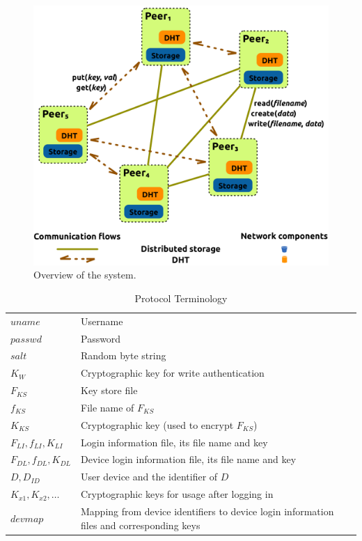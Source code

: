 \begin{figure}
  \centering
  \includegraphics[width=.44\textwidth]{images/passwords-peer-to-peer/system-overview-fully-distributed}
  \caption{Overview of the system.}
\end{figure}

\begin{table}[htb]
\centering
\caption{Protocol Terminology}
    \begin{tabular}{lp{5.92cm}}
 		\toprule
		$uname$ & Username\\
		$passwd$ & Password\\
		$salt$ & Random byte string\\
		$K_W$ & Cryptographic key for write authentication \\
		$F_{KS}$ & Key store file\\
		$f_{KS}$ & File name of $F_{KS}$\\
		$K_{KS}$ & Cryptographic key (used to encrypt $F_{KS}$)\\
		$F_{LI}, f_{LI}, K_{LI}$ & Login information file, its file name and key\\
		$F_{DL}, f_{DL}, K_{DL}$ & Device login information file, its file name and key\\
		$D, D_{ID}$ & User device and the identifier of $D$\\
		$K_{x1}, K_{x2}, \dots$ & Cryptographic keys for usage after logging in\\
		$devmap$ & Mapping from device identifiers to device login information files and corresponding keys\\
		\bottomrule
    \end{tabular}
\end{table}

